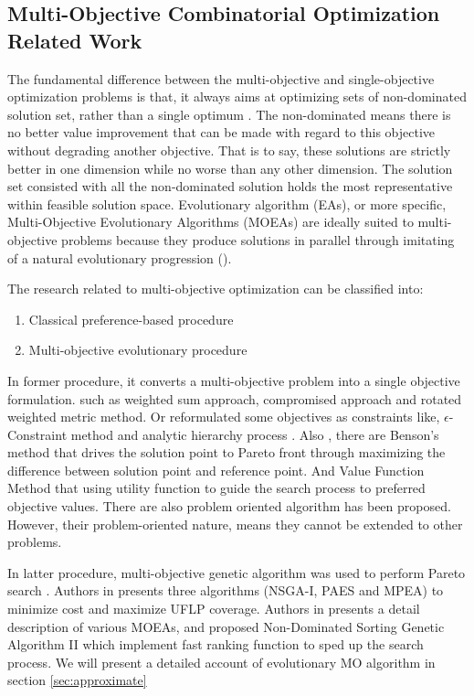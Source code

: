 \documentclass[10pt,journal,compsoc]{IEEEtran}
\begin{document}
\subsection{Multi-Objective Combinatorial Optimization Related Work}
The fundamental difference between the multi-objective  and single-objective optimization problems is that, it always aims at optimizing sets of non-dominated solution set, rather than a single optimum \cite{deb2001multi}. The non-dominated means there is no better value improvement that can be made with regard to this objective without degrading another objective. That is to say, these solutions are strictly better in one dimension while no worse than any other dimension. The solution set consisted with all the non-dominated solution holds the most representative within feasible solution space. Evolutionary algorithm (EAs), or more specific, Multi-Objective Evolutionary Algorithms (MOEAs) are ideally suited to multi-objective problems because they produce solutions in parallel through imitating of a natural evolutionary progression (\cite{Deb:2001:MOU:559152}).

The research related to multi-objective optimization can be classified into:
\begin{enumerate}
\item Classical preference-based procedure 
\item Multi-objective evolutionary procedure
\end{enumerate}
In former procedure, it converts a multi-objective problem into a single objective formulation. such as weighted sum approach, compromised approach and rotated weighted metric method\cite{classic}. Or reformulated some objectives as constraints like, $\epsilon$-Constraint method and analytic hierarchy process \cite{MEADE1998201}. Also , there are Benson's method \cite{Benson1998} that drives the solution point to Pareto front through maximizing the difference between solution point and reference point. And Value Function Method that using utility function to guide the search process to preferred objective values. There are also problem oriented algorithm\cite{gen2000genetic} has been proposed. However, their problem-oriented nature, means they cannot be extended to other problems. 

In latter procedure, multi-objective genetic algorithm was used to perform Pareto search\cite{DING2006609} \cite{Bachlaus2008} \cite{cheshmehgaz2013flexible}. Authors in \cite{Villegas2006} presents three algorithms (NSGA-I, PAES and MPEA) to minimize cost and maximize UFLP coverage. Authors in \cite{Deb:2001:MOU:559152} presents a detail description of various MOEAs, and proposed Non-Dominated Sorting Genetic Algorithm II which implement fast ranking function to sped up the search process. We will present a detailed account of evolutionary MO algorithm in section \ref{sec:approximate}
\end{document}

